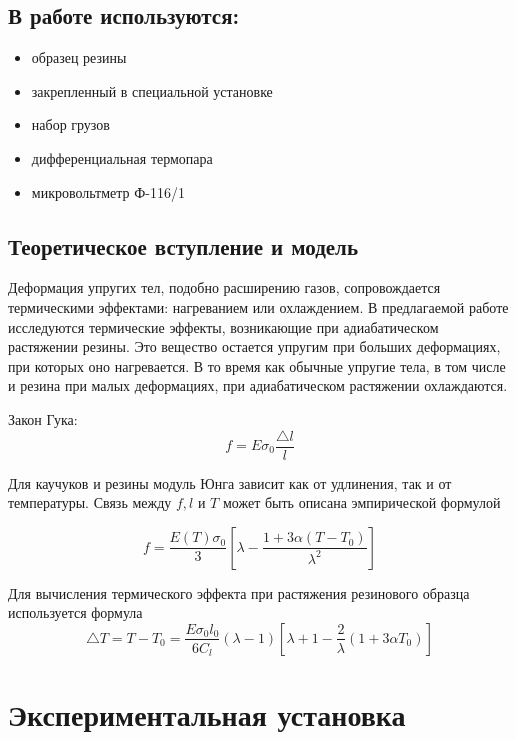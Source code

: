 \documentclass[a4paper,11.5pt]{article} %
\begin{document}
\subsection{В работе используются:}
\begin{itemize}
    \item образец резины
    \item закрепленный в специальной установке
    \item набор грузов
    \item дифференциальная термопара
    \item микровольтметр Ф-116/1
\end{itemize}

\subsection{Теоретическое вступление и модель}

Деформация упругих тел, подобно расширению газов, сопровождается термическими эффектами: нагреванием или охлаждением. В предлагаемой работе исследуются термические эффекты, возникающие при адиабатическом растяжении резины. Это вещество остается упругим при больших деформациях, при которых оно нагревается. В то время как обычные упругие тела, в том числе и резина при малых деформациях, при адиабатическом растяжении охлаждаются.

Закон Гука:
\begin{equation}
f = E \sigma_0 \frac{\triangle l}{l}
\end{equation}

Для каучуков и резины модуль Юнга зависит как от удлинения, так и от температуры. Связь между $f, l$ и $T$ может быть описана эмпирической формулой

\begin{equation}
f = \frac{E(T)\sigma_0}{3}[\lambda - \frac{1 + 3 \alpha (T - T_0)}{\lambda^2}]
\end{equation}

Для вычисления термического эффекта при растяжения резинового образца используется формула
\begin{equation}
\triangle T = T - T_0 = \frac{E\sigma_0 l_0}{6C_l}(\lambda - 1)[\lambda + 1 - \frac{2}{\lambda}(1 + 3\alpha T_0)]
\end{equation}

\section{Экспериментальная установка}
\end{document}
